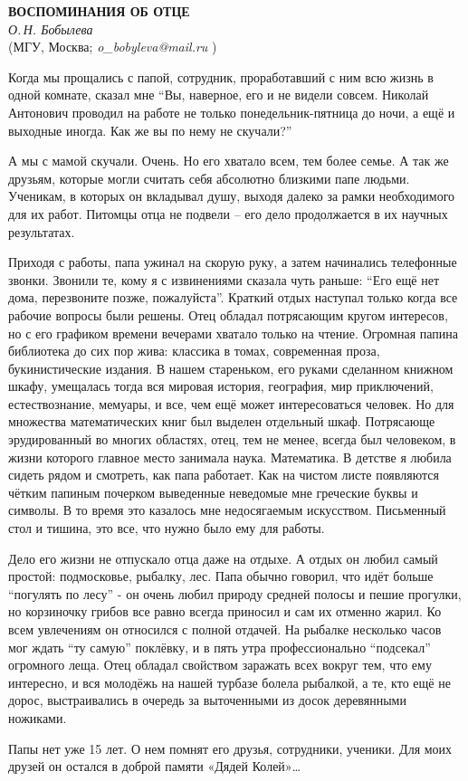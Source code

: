 \begin{center}{ \bf  ВОСПОМИНАНИЯ ОБ ОТЦЕ}\\
{\it О.\,Н. Бобылева} \\
(МГУ, Москва; {\it o\_bobyleva@mail.ru } )
\end{center}

Когда мы прощались с папой, сотрудник, проработавший с ним всю жизнь в одной комнате, сказал мне “Вы, наверное, его и не видели совсем. Николай Антонович проводил на работе не только понедельник-пятница до ночи, а ещё и выходные иногда. Как же вы по нему не скучали?”

А мы с мамой скучали. Очень. Но его хватало всем, тем более семье. А так же друзьям, которые могли считать себя абсолютно близкими папе людьми. Ученикам, в которых он вкладывал душу, выходя далеко за рамки необходимого для их работ. Питомцы отца не подвели – его дело продолжается в их научных результатах.

Приходя с работы, папа ужинал на скорую руку, а затем начинались телефонные звонки. Звонили те, кому я с извинениями сказала чуть раньше: “Его ещё нет дома, перезвоните позже, пожалуйста”. Краткий отдых наступал только когда все рабочие вопросы были решены. Отец обладал потрясающим кругом интересов, но с его графиком времени вечерами хватало только на чтение. Огромная папина библиотека до сих пор жива: классика в томах, современная проза, букинистические издания. В нашем стареньком, его руками сделанном книжном шкафу, умещалась тогда вся мировая история, география, мир приключений, естествознание, мемуары, и все, чем ещё может интересоваться человек. Но для множества математических книг был выделен отдельный шкаф. Потрясающе эрудированный во многих областях, отец, тем не менее, всегда был человеком, в жизни которого главное место занимала наука. Математика. В детстве я любила сидеть рядом и смотреть, как папа работает. Как на чистом листе появляются чётким папиным почерком выведенные неведомые мне греческие буквы и символы. В то время это казалось мне недосягаемым искусством. Письменный стол и тишина, это все, что нужно было ему для работы.

Дело его жизни не отпускало отца даже на отдыхе. А отдых он любил самый простой: подмосковье, рыбалку, лес. Папа обычно говорил, что идёт больше “погулять по лесу” - он очень любил природу средней полосы и пешие прогулки, но корзиночку грибов все равно всегда приносил и сам их отменно жарил. Ко всем увлечениям он относился с полной отдачей. На рыбалке несколько часов мог ждать “ту самую” поклёвку, и в пять утра профессионально “подсекал” огромного леща. Отец обладал свойством заражать всех вокруг тем, что ему интересно, и вся молодёжь на нашей турбазе болела рыбалкой, а те, кто ещё не дорос, выстраивались в очередь за выточенными из досок деревянными ножиками.

Папы нет уже 15 лет. О нем помнят его друзья, сотрудники, ученики. Для моих друзей он остался в доброй памяти «Дядей Колей»…
